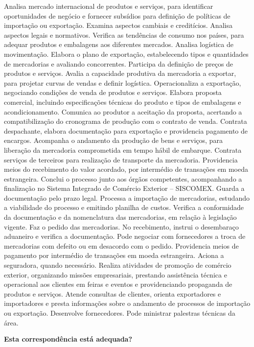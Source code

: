 \documentclass[
]{article}
\begin{document}
Analisa mercado internacional de produtos e serviços, para identificar
oportunidades de negócio e fornecer subsídios para definição de
políticas de importação ou exportação. Examina aspectos cambiais e
creditícios. Analisa aspectos legais e normativos. Verifica as
tendências de consumo nos países, para adequar produtos e embalagens aos
diferentes mercados. Analisa logística de movimentação. Elabora o plano
de exportação, estabelecendo tipos e quantidades de mercadorias e
avaliando concorrentes. Participa da definição de preços de produtos e
serviços. Avalia a capacidade produtiva da mercadoria a exportar, para
projetar curvas de vendas e definir logística. Operacionaliza a
exportação, negociando condições de venda de produtos e serviços.
Elabora proposta comercial, incluindo especificações técnicas do produto
e tipos de embalagens e acondicionamento. Comunica ao produtor a
aceitação da proposta, acertando a compatibilização do cronograma de
produção com o contrato de venda. Contrata despachante, elabora
documentação para exportação e providencia pagamento de encargos.
Acompanha o andamento da produção de bens e serviços, para liberação da
mercadoria comprometida em tempo hábil de embarque. Contrata serviços de
terceiros para realização de transporte da mercadoria. Providencia meios
do recebimento do valor acordado, por intermédio de transações em moeda
estrangeira. Conclui o processo junto aos órgãos competentes,
acompanhando a finalização no Sistema Integrado de Comércio Exterior --
SISCOMEX. Guarda a documentação pelo prazo legal. Processa a importação
de mercadorias, estudando a viabilidade do processo e emitindo planilha
de custos. Verifica a conformidade da documentação e da nomenclatura das
mercadorias, em relação à legislação vigente. Faz o pedido das
mercadorias. No recebimento, instrui o desembaraço aduaneiro e verifica
a documentação. Pode negociar com fornecedores a troca de mercadorias
com defeito ou em desacordo com o pedido. Providencia meios de pagamento
por intermédio de transações em moeda estrangeira. Aciona a seguradora,
quando necessário. Realiza atividades de promoção de comércio exterior,
organizando missões empresariais, prestando assistência técnica e
operacional aos clientes em feiras e eventos e providenciando propaganda
de produtos e serviços. Atende consultas de clientes, orienta
exportadores e importadores e presta informações sobre o andamento de
processos de importação ou exportação. Desenvolve fornecedores. Pode
ministrar palestras técnicas da área.

\begin{Form}
\textbf{Esta correspondência está adequada?} \\ 
\end{Form}
\end{document}
